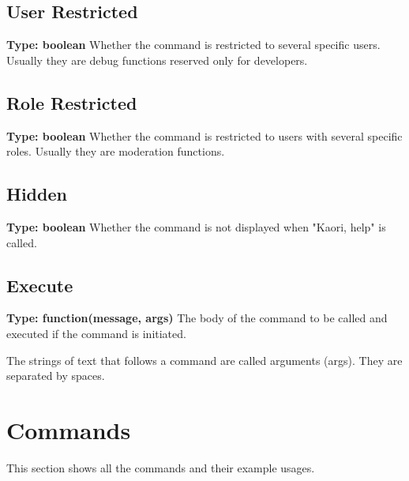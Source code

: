 \documentclass[11pt]{article}
\begin{document}
\subsection{User Restricted}
\textbf{Type: boolean} \hspace{5pt} Whether the command is restricted to several specific users. Usually they are debug functions reserved only for developers.

\subsection{Role Restricted}
\textbf{Type: boolean} \hspace{5pt} Whether the command is restricted to users with several specific roles. Usually they are moderation functions.

\subsection{Hidden}
\textbf{Type: boolean} \hspace{5pt} Whether the command is not displayed when "Kaori, help" is called.


\subsection{Execute}
\textbf{Type: function(message, args)} \hspace{5pt}
The body of the command to be called and executed if the command is initiated.

\medskip

The strings of text that follows a command are called arguments (args). They are separated by spaces. 

\newpage

\section{Commands}
This section shows all the commands and their example usages.
\end{document}
